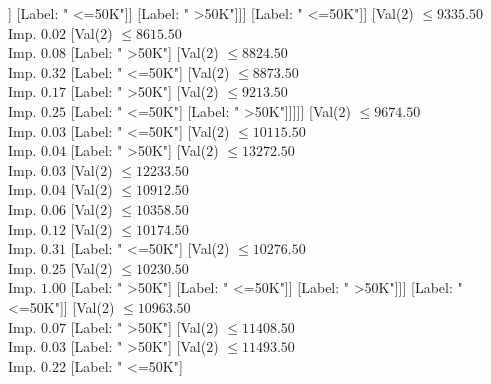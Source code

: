 \documentclass[margin=10pt]{standalone}
\begin{document}
\begin{forest}
													[Val($2$) $ \leq 7159.50$ \\ Imp. $0.11$
														[Val($2$) $ \leq 7068.50$ \\ Imp. $0.32$
															[Val($2$) $ \leq 6936.50$ \\ Imp. $0.31$
																[Label: " <=50K"]
																[Label: " >50K"]]
															[Label: " <=50K"]]
														[Label: " >50K"]]]
												[Label: " <=50K"]]
											[Val($2$) $ \leq 9335.50$ \\ Imp. $0.02$
												[Val($2$) $ \leq 8615.50$ \\ Imp. $0.08$
													[Label: " >50K"]
													[Val($2$) $ \leq 8824.50$ \\ Imp. $0.32$
														[Label: " <=50K"]
														[Val($2$) $ \leq 8873.50$ \\ Imp. $0.17$
															[Label: " >50K"]
															[Val($2$) $ \leq 9213.50$ \\ Imp. $0.25$
																[Label: " <=50K"]
																[Label: " >50K"]]]]]
												[Val($2$) $ \leq 9674.50$ \\ Imp. $0.03$
													[Label: " <=50K"]
													[Val($2$) $ \leq 10115.50$ \\ Imp. $0.04$
														[Label: " >50K"]
														[Val($2$) $ \leq 13272.50$ \\ Imp. $0.03$
															[Val($2$) $ \leq 12233.50$ \\ Imp. $0.04$
																[Val($2$) $ \leq 10912.50$ \\ Imp. $0.06$
																	[Val($2$) $ \leq 10358.50$ \\ Imp. $0.12$
																		[Val($2$) $ \leq 10174.50$ \\ Imp. $0.31$
																			[Label: " <=50K"]
																			[Val($2$) $ \leq 10276.50$ \\ Imp. $0.25$
																				[Val($2$) $ \leq 10230.50$ \\ Imp. $1.00$
																					[Label: " >50K"]
																					[Label: " <=50K"]]
																				[Label: " >50K"]]]
																		[Label: " <=50K"]]
																	[Val($2$) $ \leq 10963.50$ \\ Imp. $0.07$
																		[Label: " >50K"]
																		[Val($2$) $ \leq 11408.50$ \\ Imp. $0.03$
																			[Label: " >50K"]
																			[Val($2$) $ \leq 11493.50$ \\ Imp. $0.22$
																				[Label: " <=50K"]

\end{forest}
\end{document}
